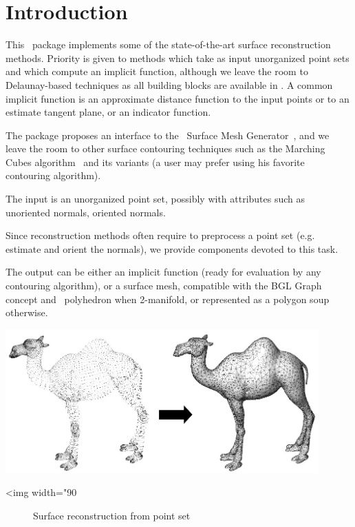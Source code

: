 \section{Introduction}

This \cgal\ package implements some
of the state-of-the-art surface reconstruction methods. Priority is
given to methods which take as input unorganized point sets and
which compute an implicit function, although we leave the room to
Delaunay-based techniques as all building blocks are available in
\cgal. A common implicit function is an approximate distance function
to the input points or to an estimate tangent plane, or an indicator
function.

The package proposes an interface to the \cgal\ Surface Mesh Generator~\cite{cgal:ry-gsddrm-06,cgal:bo-pgsms-05},
and we leave the room to other surface contouring techniques such
as the Marching Cubes algorithm~\cite{LC87} and its variants (a
user may prefer using his favorite contouring algorithm).

The input is an unorganized point set, possibly with attributes
such as unoriented normals, oriented normals.

Since reconstruction methods often require to preprocess a point set
(e.g. estimate and orient the normals), we provide components devoted
to this task.

The output can be either an implicit function (ready for evaluation
by any contouring algorithm), or a surface mesh, compatible with the
BGL Graph concept and \cgal\ polyhedron when 2-manifold, or represented
as a polygon soup otherwise.

\begin{center}
    \label{Surface_reconstruction_3-fig-introduction}
    \begin{ccTexOnly}
        \includegraphics[width=0.9\textwidth]{Surface_reconstruction_3/introduction} %
    \end{ccTexOnly}
    \begin{ccHtmlOnly}
        <img width="90%
    \end{ccHtmlOnly}
    \begin{figure}[h]
        \caption{Surface reconstruction from point set}
    \end{figure}
\end{center}


